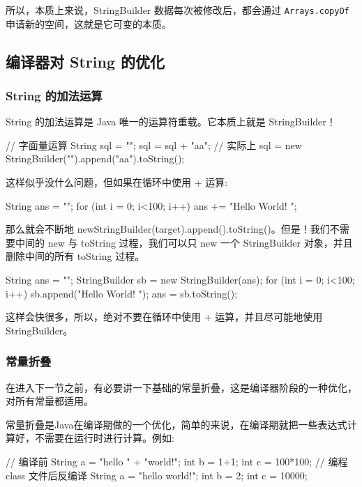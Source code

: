 所以，本质上来说，StringBuilder 数据每次被修改后，都会通过 \texttt{Arrays.copyOf} 申请新的空间，这就是它可变的本质。

\subsection{编译器对 String 的优化}

\subsubsection{String 的加法运算}

String 的加法运算是 Java 唯一的运算符重载。它本质上就是 StringBuilder！

\begin{Java}
// 字面量运算
String sql = "";
sql = sql + "aa";
// 实际上
sql = new StringBuilder("").append("aa").toString();
\end{Java}

这样似乎没什么问题，但如果在循环中使用 + 运算:
\begin{Java}
String ans = "";
for (int i = 0; i<100; i++)
    ans += "Hello World! ";
\end{Java}

那么就会不断地 newStringBuilder(target).append().toString()。但是！我们不需要中间的 new 与 toString 过程，我们可以只 new 一个 StringBuilder 对象，并且删除中间的所有 toString 过程。

\begin{Java}
String ans = "";
StringBuilder sb = new StringBuilder(ans);
for (int i = 0; i<100; i++)
    sb.append("Hello World! ");
ans = sb.toString();
\end{Java}

这样会快很多，所以，绝对不要在循环中使用 + 运算，并且尽可能地使用 StringBuilder。

\subsubsection{常量折叠}

在进入下一节之前，有必要讲一下基础的常量折叠，这是编译器阶段的一种优化，对所有常量都适用。



常量折叠是Java在编译期做的一个优化，简单的来说，在编译期就把一些表达式计算好，不需要在运行时进行计算。例如:

\begin{Java}
// 编译前
String a = "hello " + "world!";
int b = 1+1;
int c = 100*100;
// 编程 class 文件后反编译
String a = "hello world!";
int b = 2;
int c = 10000;
\end{Java}

